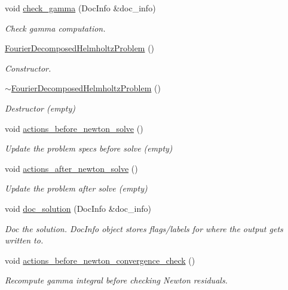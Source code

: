 \begin{DoxyCompactItemize}
void \hyperlink{classFourierDecomposedHelmholtzProblem_ac4f3f737660b11e8762a61bca999eb0f}{check\+\_\+gamma} (Doc\+Info \&doc\+\_\+info)
\begin{DoxyCompactList}\small\item\em Check gamma computation. \end{DoxyCompactList}\item 
\hyperlink{classFourierDecomposedHelmholtzProblem_ab368ed8fe04d4e3db67d13bab9e7b52e}{Fourier\+Decomposed\+Helmholtz\+Problem} ()
\begin{DoxyCompactList}\small\item\em Constructor. \end{DoxyCompactList}\item 
\hyperlink{classFourierDecomposedHelmholtzProblem_a03174fa5a35b7c38f08f91bcd2a80c20}{$\sim$\+Fourier\+Decomposed\+Helmholtz\+Problem} ()
\begin{DoxyCompactList}\small\item\em Destructor (empty) \end{DoxyCompactList}\item 
void \hyperlink{classFourierDecomposedHelmholtzProblem_a82ef5a969f4404fc1acb35c38c800ce6}{actions\+\_\+before\+\_\+newton\+\_\+solve} ()
\begin{DoxyCompactList}\small\item\em Update the problem specs before solve (empty) \end{DoxyCompactList}\item 
void \hyperlink{classFourierDecomposedHelmholtzProblem_a5a37ba3fcf8563764f80108c9a657929}{actions\+\_\+after\+\_\+newton\+\_\+solve} ()
\begin{DoxyCompactList}\small\item\em Update the problem after solve (empty) \end{DoxyCompactList}\item 
void \hyperlink{classFourierDecomposedHelmholtzProblem_a893efb01f8f1d254315201121766d882}{doc\+\_\+solution} (Doc\+Info \&doc\+\_\+info)
\begin{DoxyCompactList}\small\item\em Doc the solution. Doc\+Info object stores flags/labels for where the output gets written to. \end{DoxyCompactList}\item 
void \hyperlink{classFourierDecomposedHelmholtzProblem_ae80673ef299e4935ddcac177ed919da3}{actions\+\_\+before\+\_\+newton\+\_\+convergence\+\_\+check} ()
\begin{DoxyCompactList}\small\item\em Recompute gamma integral before checking Newton residuals. \end{DoxyCompactList}\item 

\end{DoxyCompactItemize}
